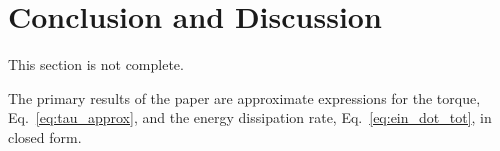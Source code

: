 \documentclass[
        fleqn,
        usenatbib,
    ]{mnras}
\begin{document}


\section{Conclusion and Discussion}\label{s:disc}

\textcolor{Corr}{This section is not complete.}

The primary results of the paper are approximate expressions for the torque,
Eq.~\eqref{eq:tau_approx}, and the energy dissipation rate,
Eq.~\eqref{eq:ein_dot_tot}, in closed form.
\end{document}
